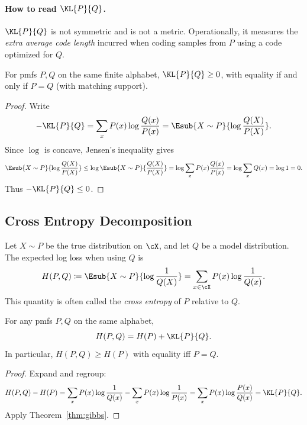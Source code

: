 \paragraph{How to read $\KL{P}{Q}$.}
$\KL{P}{Q}$ is not symmetric and is not a metric.
Operationally, it measures the \emph{extra average code length} incurred when coding samples from $P$ using a code optimized for $Q$.

\begin{theorem}
\label{thm:gibbs}
For pmfs $P,Q$ on the same finite alphabet,
\(\KL{P}{Q}\ge 0\), with equality if and only if $P=Q$ (with matching support).
\end{theorem}
\begin{proof}
Write
\[
-\KL{P}{Q} = \sum_x P(x)\log\frac{Q(x)}{P(x)} = \Esub{X\sim P}{\log\frac{Q(X)}{P(X)}}.
\]
Since $\log$ is concave, Jensen's inequality gives
\[
\Esub{X\sim P}{\log\frac{Q(X)}{P(X)}}
\le \log \Esub{X\sim P}{\frac{Q(X)}{P(X)}}
= \log \sum_x P(x)\frac{Q(x)}{P(x)}
= \log \sum_x Q(x)
= \log 1 =0.
\]
Thus $-\KL{P}{Q}\le 0$.
\end{proof}

\subsection{Cross Entropy Decomposition}
\label{sec:entropy-cross-entropy}

Let $X\sim P$ be the true distribution on $\cX$, and let $Q$ be a model distribution.
The expected log loss when using $Q$ is
\begin{equation}
    H(P,Q) \coloneqq \Esub{X\sim P}{\log\frac{1}{Q(X)}}
    = \sum_{x\in\cX} P(x)\log\frac{1}{Q(x)}.
\end{equation}
This quantity is often called the \emph{cross entropy} of $P$ relative to $Q$.

\begin{theorem}
\label{thm:cross-entropy-decomp}
For any pmfs $P,Q$ on the same alphabet,
\begin{equation}
    H(P,Q) = H(P) + \KL{P}{Q}.
\end{equation}
In particular, $H(P,Q)\ge H(P)$ with equality iff $P=Q$.
\end{theorem}
\begin{proof}
Expand and regroup:
\[
H(P,Q)-H(P)
= \sum_x P(x)\log\frac{1}{Q(x)} - \sum_x P(x)\log\frac{1}{P(x)}
= \sum_x P(x)\log\frac{P(x)}{Q(x)}
= \KL{P}{Q}.
\]
Apply Theorem~\ref{thm:gibbs}.
\end{proof}

